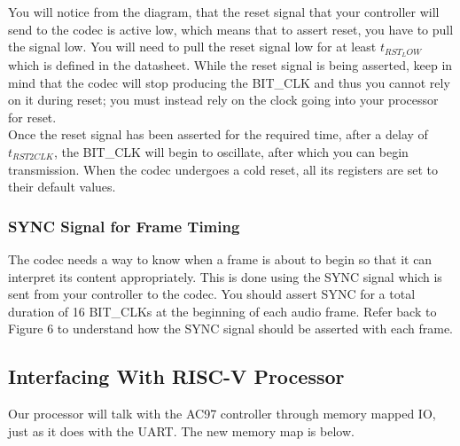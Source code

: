 \documentclass[11pt]{article}
\begin{document}
You will notice from the diagram, that the reset signal that your controller will send to the codec is active low, which means that to assert reset, you have to pull the signal low. You will need to pull the reset signal low for at least $t_{RST_LOW}$ which is defined in the datasheet. While the reset signal is being asserted, keep in mind that the codec will stop producing the BIT\_CLK and thus you cannot rely on it during reset; you must instead rely on the clock going into your processor for reset. \\

Once the reset signal has been asserted for the required time, after a delay of $t_{RST2CLK}$, the BIT\_CLK will begin to oscillate, after which you can begin transmission. When the codec undergoes a cold reset, all its registers are set to their default values.

\subsubsection{SYNC Signal for Frame Timing}
The codec needs a way to know when a frame is about to begin so that it can interpret its content appropriately. This is done using the SYNC signal which is sent from your controller to the codec. You should assert SYNC for a total duration of 16 BIT\_CLKs at the beginning of each audio frame. Refer back to Figure 6 to understand how the SYNC signal should be asserted with each frame.

\subsection{Interfacing With RISC-V Processor}
Our processor will talk with the AC97 controller through memory mapped IO, just as it does with the UART. The new memory map is below.
\end{document}
